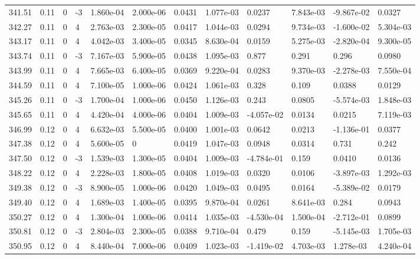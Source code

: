 \documentclass[preview]{standalone}
\begin{document}
{{{{{{{{{{{{{{{{\begin{tabular}{L{1.2cm}C{1.2cm} C{0.3cm}C{0.5cm} C{1.4cm}C{1.4cm} C{1.4cm}C{1.4cm} C{1.6cm}C{1.6cm} C{1.6cm}C{1.6cm}}
  341.51  &  0.11  & 0     & -3 &  1.860e-04  & 2.000e-06  &  0.0431&   1.077e-03& 0.0237 & 7.843e-03   &  -9.867e-02 & 0.0327  \\ 
  342.27  &  0.11  & 0     &  4 &  2.763e-03  & 2.300e-05  &  0.0417&   1.044e-03& 0.0294 & 9.734e-03   &  -1.600e-02 & 5.304e-03  \\ 
  343.17  &  0.11  & 0     &  4 &  4.042e-03  & 3.400e-05  &  0.0345&   8.630e-04& 0.0159 & 5.275e-03   &  -2.820e-04 & 9.300e-05  \\ 
  343.74  &  0.11  & 0     & -3 &  7.167e-03  & 5.900e-05  &  0.0438&   1.095e-03& 0.877 & 0.291   &  0.296 & 0.0980  \\ 
  343.99  &  0.11  & 0     &  4 &  7.665e-03  & 6.400e-05  &  0.0369&   9.220e-04& 0.0283 & 9.370e-03   &  -2.278e-03 & 7.550e-04  \\ 
  344.59  &  0.11  & 0     &  4 &  7.100e-05  & 1.000e-06  &  0.0424&   1.061e-03& 0.328 & 0.109   &  0.0388 & 0.0129  \\ 
  345.26  &  0.11  & 0     & -3 &  1.700e-04  & 1.000e-06  &  0.0450&   1.126e-03& 0.243 & 0.0805   &  -5.574e-03 & 1.848e-03  \\ 
  345.65  &  0.11  & 0     &  4 &  4.420e-04  & 4.000e-06  &  0.0404&   1.009e-03& -4.057e-02 & 0.0134   &  0.0215 & 7.119e-03  \\ 
  346.99  &  0.12  & 0     &  4 &  6.632e-03  & 5.500e-05  &  0.0400&   1.001e-03& 0.0642 & 0.0213   &  -1.136e-01 & 0.0377  \\ 
  347.38  &  0.12  & 0     &  4 &  5.600e-05  & 0  &  0.0419&   1.047e-03& 0.0948 & 0.0314   &  0.731 & 0.242  \\ 
  347.50  &  0.12  & 0     & -3 &  1.539e-03  & 1.300e-05  &  0.0404&   1.009e-03& -4.784e-01 & 0.159   &  0.0410 & 0.0136  \\ 
  348.22  &  0.12  & 0     &  4 &  2.228e-03  & 1.800e-05  &  0.0408&   1.019e-03& 0.0320 & 0.0106   &  -3.897e-03 & 1.292e-03  \\ 
  349.38  &  0.12  & 0     & -3 &  8.900e-05  & 1.000e-06  &  0.0420&   1.049e-03& 0.0495 & 0.0164   &  -5.389e-02 & 0.0179  \\ 
  349.40  &  0.12  & 0     &  4 &  1.689e-03  & 1.400e-05  &  0.0395&   9.870e-04& 0.0261 & 8.641e-03   &  0.284 & 0.0943  \\ 
  350.27  &  0.12  & 0     &  4 &  1.300e-04  & 1.000e-06  &  0.0414&   1.035e-03& -4.530e-04 & 1.500e-04   &  -2.712e-01 & 0.0899  \\ 
  350.81  &  0.12  & 0     & -3 &  2.804e-03  & 2.300e-05  &  0.0388&   9.710e-04& 0.479 & 0.159   &  -5.145e-03 & 1.705e-03  \\ 
  350.95  &  0.12  & 0     &  4 &  8.440e-04  & 7.000e-06  &  0.0409&   1.023e-03& -1.419e-02 & 4.703e-03   &  1.278e-03 & 4.240e-04  \\ 
\hline 
\end{tabular} 

}}}}}}}}}}}}}}}}
\end{document}
